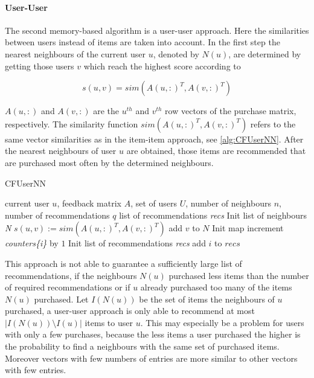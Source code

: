 \documentclass[10pt]{reportMaster}
\begin{document}
\paragraph{User-User}
The second memory-based algorithm is a user-user approach. %
Here the similarities between users instead of items are taken into account.
In the first step the nearest neighbours of the current user $u$, denoted by $N(u)$, are determined by getting those users $v$ which reach the highest score according to

\begin{equation}
	s(u,v) = sim(A(u,:)^T, A(v, :)^T)
\end{equation}

$A(u,:)$ and $A(v,:)$ are the $u^{th}$ and $v^{th}$ row vectors of the purchase matrix, respectively.
The similarity function $sim(A(u,:)^T, A(v, :)^T)$ refers to the same vector similarities as in the item-item approach, see \ref{alg:CFUserNN}.
After the nearest neighbours of user $u$ are obtained, those items are recommended that are purchased most often by the determined neighbours.

\begin{algorithm}
	\caption{CFUserNN}
	\label{alg:CFUserNN}
	\begin{algorithmic}[1]
		\Require current user $u$, feedback matrix $A$, set of users $U$, number of neighbours $n$, number of recommendations $q$
		\Ensure list of recommendations \textit{recs}
		\State Init list of neighbours \textit{N}
			\State $s(u,v) := sim(A(u,:)^T, A(v,:)^T)$
				\State add $v$ to $N$
			\EndIf
		\EndFor
		\State Init map 
				\State increment \textit{counters\{i\}} by $1$
			\EndFor
		\EndFor
		\State Init list of recommendations \textit{recs}
			\State add $i$ to $recs$
			\EndIf
		\EndFor
	\end{algorithmic}	
\end{algorithm}

This approach is not able to guarantee a sufficiently large list of recommendations, if the neighbours $N(u)$ purchased less items than the number of required recommendations or if $u$ already purchased too many of the items $N(u)$ purchased.
Let $I(N(u))$ be the set of items the neighbours of $u$ purchased, a user-user approach is only able to recommend at most $|I(N(u)) \setminus I(u)|$ items to user $u$.
This may especially be a problem for users with only a few purchases, because the less items a user purchased the higher is the probability to find a neighbours with the same set of purchased items.
Moreover vectors with few numbers of entries are more similar to other vectors with few entries.
\end{document}

